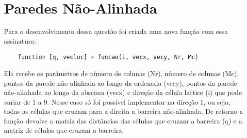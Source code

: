 %

\chapter{Paredes Não-Alinhada}\label{parte_1}

Para o desenvolvimento dessa questão foi criada uma nova função com essa assinatura:
\begin{lstlisting}
    function [q, vecloc] = funcao(i, vecx, vecy, Nr, Mc)
\end{lstlisting}

Ela recebe os parâmetros de número de colunas (Nr), número de colunas (Mc), pontos da parede não-alinhada ao longo da ordenada (vecy), pontos da parede não-alinhada ao longo da abscissa (vecx) e direção da célula lattice (i) que pode variar de 1 a 9. Nesse caso só foi possível implementar na direção 1, ou seja, todas as células que cruzam para a direita a barreira não-alinhada. De retorno a função devolve a matriz das distâncias das células que cruzam a barreira (q) e a matriz de células que cruzam a barreira.

